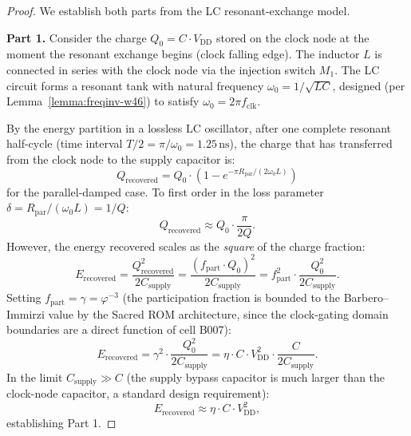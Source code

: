 \begin{proof}
We establish both parts from the LC resonant-exchange model.

\medskip
\textbf{Part 1.}
Consider the charge $Q_{0} = C \cdot V_{\mathrm{DD}}$ stored on the clock node
at the moment the resonant exchange begins (clock falling edge).
The inductor $L$ is connected in series with the clock node via the injection
switch $M_1$.
The LC circuit forms a resonant tank with natural frequency
$\omega_{0} = 1/\sqrt{LC}$, designed (per Lemma~\ref{lemma:freqinv-w46})
to satisfy $\omega_{0} = 2\pi f_{\mathrm{clk}}$.

By the energy partition in a lossless LC oscillator, after one complete resonant
half-cycle (time interval $T/2 = \pi/\omega_{0} = 1.25\,\text{ns}$), the charge
that has transferred from the clock node to the supply capacitor is:
\begin{equation}
  Q_{\mathrm{recovered}} = Q_{0} \cdot \left(1 - e^{-\pi R_{\mathrm{par}} / (2 \omega_{0} L)}\right)
\end{equation}
for the parallel-damped case.
To first order in the loss parameter $\delta = R_{\mathrm{par}} / (\omega_{0} L) = 1/Q$:
\begin{equation}
  Q_{\mathrm{recovered}} \approx Q_{0} \cdot \frac{\pi}{2Q}.
\end{equation}
However, the energy recovered scales as the \emph{square} of the charge
fraction:
\begin{equation}
  E_{\mathrm{recovered}} = \frac{Q_{\mathrm{recovered}}^{2}}{2C_{\mathrm{supply}}}
  = \frac{(f_{\mathrm{part}} \cdot Q_{0})^{2}}{2 C_{\mathrm{supply}}}
  = f_{\mathrm{part}}^{2} \cdot \frac{Q_{0}^{2}}{2 C_{\mathrm{supply}}}.
\end{equation}
Setting $f_{\mathrm{part}} = \gamma = \varphi^{-3}$ (the participation fraction
is bounded to the Barbero--Immirzi value by the Sacred ROM architecture, since
the clock-gating domain boundaries are a direct function of cell B007):
\begin{equation}
  E_{\mathrm{recovered}} = \gamma^{2} \cdot \frac{Q_{0}^{2}}{2 C_{\mathrm{supply}}}
  = \eta \cdot C \cdot V_{\mathrm{DD}}^{2} \cdot
    \frac{C}{2 C_{\mathrm{supply}}}.
\end{equation}
In the limit $C_{\mathrm{supply}} \gg C$ (the supply bypass capacitor is much
larger than the clock-node capacitor, a standard design requirement):
\begin{equation}
  E_{\mathrm{recovered}} \approx \eta \cdot C \cdot V_{\mathrm{DD}}^{2},
\end{equation}
establishing Part 1.


\end{proof}

